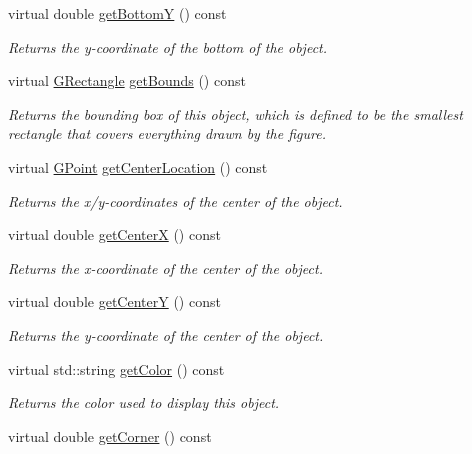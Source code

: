 \begin{DoxyCompactItemize}
virtual double \mbox{\hyperlink{classsgl_1_1GObject_a4316a2406c18e1c6d061fe51fd355490}{get\+BottomY}} () const
\begin{DoxyCompactList}\small\item\em Returns the {\itshape y}-\/coordinate of the bottom of the object. \end{DoxyCompactList}\item 
virtual \mbox{\hyperlink{structsgl_1_1GRectangle}{G\+Rectangle}} \mbox{\hyperlink{classsgl_1_1GObject_a29e6ac35a0b48f491a4c88194cc5da3b}{get\+Bounds}} () const
\begin{DoxyCompactList}\small\item\em Returns the bounding box of this object, which is defined to be the smallest rectangle that covers everything drawn by the figure. \end{DoxyCompactList}\item 
virtual \mbox{\hyperlink{structsgl_1_1GPoint}{G\+Point}} \mbox{\hyperlink{classsgl_1_1GObject_a0909472e91448470bccdb62ecfb95d8b}{get\+Center\+Location}} () const
\begin{DoxyCompactList}\small\item\em Returns the x/y-\/coordinates of the center of the object. \end{DoxyCompactList}\item 
virtual double \mbox{\hyperlink{classsgl_1_1GObject_a04df74355b545e0543112d5b8d924176}{get\+CenterX}} () const
\begin{DoxyCompactList}\small\item\em Returns the {\itshape x}-\/coordinate of the center of the object. \end{DoxyCompactList}\item 
virtual double \mbox{\hyperlink{classsgl_1_1GObject_acb3287a3d507025a26f54b895713b947}{get\+CenterY}} () const
\begin{DoxyCompactList}\small\item\em Returns the {\itshape y}-\/coordinate of the center of the object. \end{DoxyCompactList}\item 
virtual std\+::string \mbox{\hyperlink{classsgl_1_1GObject_aa061dfa488c31e18549d64363c1d0e34}{get\+Color}} () const
\begin{DoxyCompactList}\small\item\em Returns the color used to display this object. \end{DoxyCompactList}\item 
virtual double \mbox{\hyperlink{classsgl_1_1GRoundRect_ad29f4fe71bbd3f4302d25adbee70ba2b}{get\+Corner}} () const

\end{DoxyCompactItemize}
